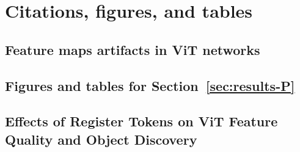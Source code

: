 
\appendix

\clearpage
\section{Citations, figures, and tables}


\clearpage
\subsection{Feature maps artifacts in ViT networks}


\clearpage
\subsection{Figures and tables for Section~\ref{sec:results-P}}


\clearpage
\subsection{Effects of Register Tokens on ViT Feature Quality and Object Discovery}

